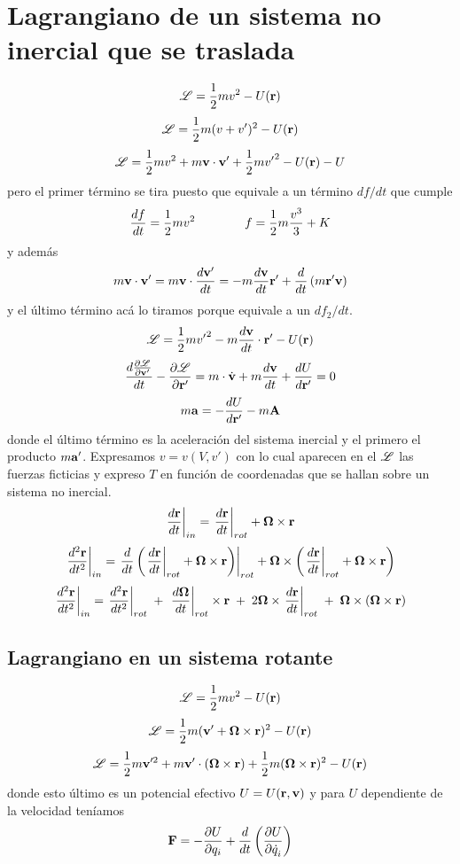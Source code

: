\documentclass[10pt,oneside]{CBFT_book}
\begin{document}
\section{Lagrangiano de un sistema no inercial que se traslada}

\[
	\Lag = \frac{1}{2} m v^2 - U(\vb{r})
\]
\[
	\Lag = \frac{1}{2} m ( v + v' )^2 - U(\vb{r})
\]
\[
	\Lag = \frac{1}{2} m  v^2 + m \vb{v}\cdot\vb{v}' +\frac{1}{2} m {v'}^2 - U(\vb{r}) - U
\]
pero el primer término se  tira puesto que equivale a un término $df/dt$ que cumple 
\[
	\frac{d^{\hspace{-0.05em}} {f}}{d {t}^{\hspace{-0.05em}}} = \frac{1}{2} m  v^2 \qquad \qquad f = \frac{1}{2} m  \frac{v^3}{3} + K
\]
y además 
\[
	 m \vb{v}\cdot\vb{v}' =  m \vb{v}\cdot \dtot{\vb{v}'}{t} = - m \dtot{\vb{v}}{t} \vb{r}' 
				+ \frac{d}{dt}\left( m \vb{r}' \vb{v} \right)
\]
y el último término acá lo tiramos porque equivale a un $df_2/dt$.
\[
	\Lag = \frac{1}{2} m {v'}^2 - m \dtot{\vb{v}}{t}\cdot\vb{r}' - U(\vb{r})
\]
\[
	\dtot{\dpar{\Lag}{\vb{v}'}}{t} -\dpar{\Lag}{\vb{r}'} =
		m\cdot\dot{\vb{v}} + m \dtot{\vb{v}}{t} + \dtot{U}{\vb{r}'} = 0
\]
\[
	m \vb{a} = -\dtot{U}{\vb{r}'} - m \vb{A}
\]
donde el último término es la aceleración del sistema inercial y el primero el producto $m\vb{a}'$.
Expresamos $v=v(V,v')$ con lo cual aparecen en el $\mathscr{L}$ las fuerzas ficticias y expreso $T$ en 
función de coordenadas que se hallan sobre un sistema no inercial.
\[
	\left. \dtot{\vb{r}}{t} \right|_{in} = \left. \dtot{\vb{r}}{t} \right|_{rot} + \vb{\Omega} \times \vb{r}
\]
\[
	\left. \dtot[2]{\vb{r}}{t} \right|_{in} = 
	\left. \frac{d}{dt}\left( \left. \dtot{\vb{r}}{t} \right|_{rot} + \vb{\Omega} \times \vb{r} \right) \right|_{rot}
	+ \vb{\Omega} \times \left( \left. \dtot{\vb{r}}{t} \right|_{rot} + \vb{\Omega} \times \vb{r} \right)
\]
\[
	\left. \dtot[2]{\vb{r}}{t} \right|_{in} = 
	\left. \dtot[2]{\vb{r}}{t} \right|_{rot}  \; +  \; \left.\dtot{\vb{\Omega}}{t}\right|_{rot} \times \vb{r}
	 \;  + \; 2 \vb{\Omega} \times \left. \dtot{\vb{r}}{t} \right|_{rot} 
	 \;  + \;  \vb{\Omega} \times \left( \vb{\Omega} \times \vb{r} \right)
\]

\subsection{Lagrangiano en un sistema rotante}

\[
	\Lag = \frac{1}{2} m v^2 - U(\vb{r})
\]
\[
	\Lag = \frac{1}{2} m ( \vb{v}' + \vb{\Omega} \times \vb{r} )^2 - U(\vb{r})
\]
\[
	\Lag = \frac{1}{2} m \vb{v}'^2 + m \vb{v}' \cdot ( \vb{\Omega} \times \vb{r} ) + 
		\frac{1}{2} m ( \vb{\Omega} \times \vb{r} )^2 - U(\vb{r})
\]
donde esto último es un potencial efectivo $U=U(\vb{r}, \vb{v})$ y para $U$ dependiente de la velocidad
teníamos 
\[
	\vb{F} = -\dpar{U}{q_i} + \frac{d}{dt} \left( \dpar{U}{\dot{q}_i} \right) 
\]
\end{document}
